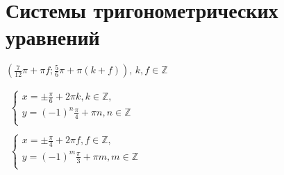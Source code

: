 \documentclass{article}
\begin{document}
\section*{Системы тригонометрических уравнений}
\begin{enumerate}
	{$\left(\frac{7}{12}\pi+\pi f; \frac{5}{6}\pi+\pi \left(k+f \right)\right)\!, \,k, f \in \mathds{Z}$}
	
	{$
		\begin{array}{ll}
			\left \{ 
				\begin{array}{ll}
 					x = \pm \frac{\pi}{6} + 2\pi k, k \in \mathds{Z}, \\
 					y = \left(-1\right)^{n} \frac{\pi}{4} + \pi n, n \in \mathds{Z}\\
  				\end{array}
  			\right. \\
 			\\
  			\left\{ 
  				\begin{array}{ll}
 					x = \pm \frac{\pi}{4} + 2\pi f, f \in \mathds{Z}, \\
 					y = \left(-1\right)^{m} \frac{\pi}{3} + \pi m, m \in \mathds{Z}\\
  				\end{array}
  			\right.
		\end{array}
	$}
\end{enumerate}
\end{document}
